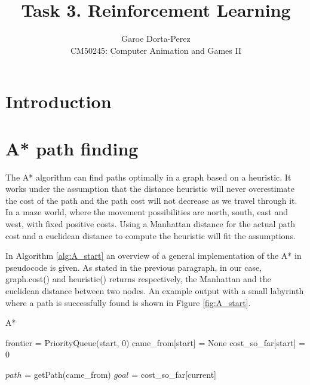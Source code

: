 \documentclass[12pt]{article}
\begin{document}
  
\title{Task 3. Reinforcement Learning}
\author{Garoe Dorta-Perez\\
CM50245: Computer Animation and Games II}
 
\maketitle
 
\section{Introduction}

\section{A* path finding}

The A*\cite{Hart1968} algorithm can find paths optimally in a graph based on a heuristic.
It works under the assumption that the distance heuristic will never overestimate the cost of the path and the path cost will not decrease as we travel through it.
In a maze world, where the movement possibilities are north, south, east and west, with fixed positive costs.
Using a Manhattan distance for the actual path cost and a euclidean distance to compute the heuristic will fit the assumptions.

In Algorithm \ref{alg:A_start} an overview of a general implementation of the A* in pseudocode is given.
As stated in the previous paragraph, in our case, graph.cost() and heuristic() returns respectively, the Manhattan and the euclidean distance between two nodes. An example output with a small labyrinth where a path is successfully found is shown in Figure \ref{fig:A_start}.

\begin{algorithm}[htbp!] \label{alg:A_start}
	\caption{A*}
	
	frontier = PriorityQueue(start, 0)\;
	came\_from[start] = None\;
	cost\_so\_far[start] = 0\;

	$path$ = getPath(came\_from)\;
	$goal$ = cost\_so\_far[current]\;
\end{algorithm}
\end{document}
